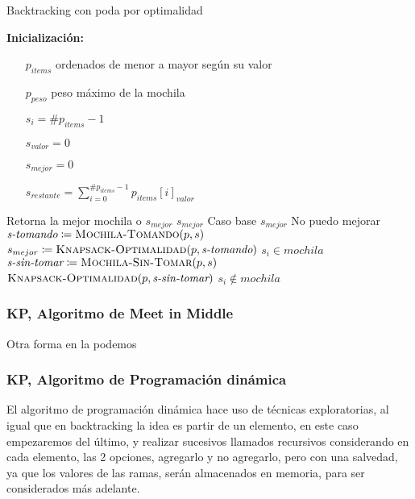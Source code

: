 \documentclass[fleqn, 11pt]{article}
\def\is{\coloneqq}
\begin{document}
\begin{algorithm}
\caption{Backtracking con poda por optimalidad}
\begin{algorithmic}[1]
\item[\textbf{Inicialización:}]
\item[] \begin{itemize}
	\item[] $p_{items}$ ordenados de menor a mayor según su valor
	\item[] $p_{peso}$ peso máximo de la mochila
	\item[] $s_i = \#p_{items} - 1$
	\item[] $s_{valor} = 0$
	\item[] $s_{mejor} = 0$
	\item[] $s_{restante} = \sum_{i = 0}^{\#p_{items} - 1} p_{items}[i]_{valor}$
\end{itemize}
\Statex
{}
\Comment Retorna la mejor mochila o $s_{mejor}$
	\State \Return $s_{mejor}$
	\Comment Caso base
\EndIf
{}
	\State \Return $s_{mejor}$
	\Comment No puedo mejorar
\EndIf
{}
	\State $\textit{s-tomando} \is \Call{Mochila-Tomando}{p, s}$
	\State $s_{mejor} \is \Call{Knapsack-Optimalidad}{p, \textit{s-tomando}}$
	\Comment $s_i \in mochila$
\EndIf
\State $\textit{s-sin-tomar} \is \Call{Mochila-Sin-Tomar}{p, s}$
\State \Return $\Call{Knapsack-Optimalidad}{p, \textit{s-sin-tomar}}$
\Comment $s_i \not\in mochila$
\EndFunction
\end{algorithmic}
\end{algorithm}
\newpage

\subsubsection{\textbf{KP, Algoritmo de Meet in Middle}}

Otra forma en la podemos

\clearpage


\subsubsection{\textbf{KP, Algoritmo de Programación dinámica}}

El algoritmo de programación dinámica hace uso de técnicas exploratorias, al igual que en backtracking la idea es
partir de un elemento, en este caso empezaremos del último, y realizar sucesivos llamados recursivos considerando
en cada elemento, las 2 opciones, agregarlo y no agregarlo, pero con una salvedad, ya que los valores de las ramas,
serán almacenados en memoria, para ser considerados más adelante. \\
\end{document}
